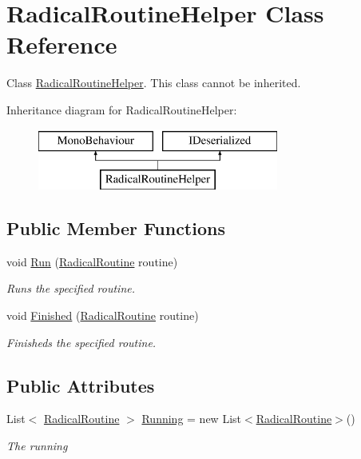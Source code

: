 \hypertarget{class_radical_routine_helper}{}\section{Radical\+Routine\+Helper Class Reference}
\label{class_radical_routine_helper}


Class \hyperlink{class_radical_routine_helper}{Radical\+Routine\+Helper}. This class cannot be inherited.  


Inheritance diagram for Radical\+Routine\+Helper\+:\begin{figure}[H]
\begin{center}
\leavevmode
\includegraphics[height=2.000000cm]{class_radical_routine_helper}
\end{center}
\end{figure}
\subsection*{Public Member Functions}
\begin{DoxyCompactItemize}
\item 
void \hyperlink{class_radical_routine_helper_ae6a4aec7bac59c73975ead99b89c64fe}{Run} (\hyperlink{class_radical_routine}{Radical\+Routine} routine)
\begin{DoxyCompactList}\small\item\em Runs the specified routine. \end{DoxyCompactList}\item 
void \hyperlink{class_radical_routine_helper_aaacd9e96eac0a194c8e06981ad7fe535}{Finished} (\hyperlink{class_radical_routine}{Radical\+Routine} routine)
\begin{DoxyCompactList}\small\item\em Finisheds the specified routine. \end{DoxyCompactList}\end{DoxyCompactItemize}
\subsection*{Public Attributes}
\begin{DoxyCompactItemize}
\item 
List$<$ \hyperlink{class_radical_routine}{Radical\+Routine} $>$ \hyperlink{class_radical_routine_helper_a42746cd71d9b42bc9096a798a9a06764}{Running} = new List$<$\hyperlink{class_radical_routine}{Radical\+Routine}$>$()
\begin{DoxyCompactList}\small\item\em The running \end{DoxyCompactList}\end{DoxyCompactItemize}

